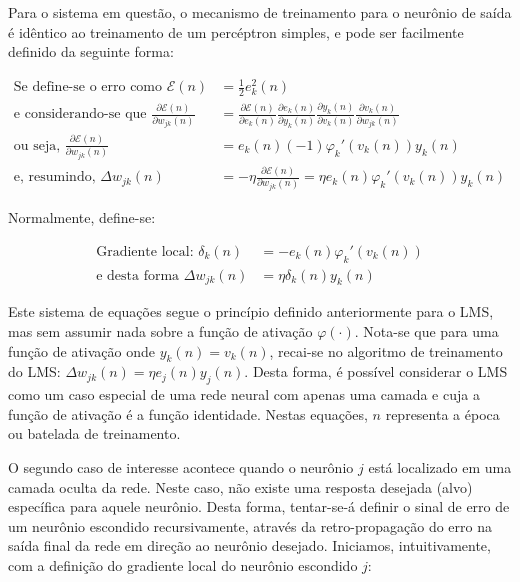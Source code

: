 Para o sistema em questão, o mecanismo de treinamento para o neurônio de saída
é idêntico ao treinamento de um percéptron simples, e pode ser facilmente
definido da seguinte forma:

\begin{align}
\text{Se define-se o erro como } \mathcal{E}(n) &= \frac{1}{2}e_{k}^{2}(n)
\label{eq:error-def} \\
\text{e considerando-se que } \frac{\partial\mathcal{E}(n)}{\partial
w_{jk}(n)} &= \frac{\partial\mathcal{E}(n)}{\partial e_k(n)} \frac{\partial
e_k(n)}{\partial y_k(n)} \frac{\partial y_k(n)}{\partial v_k(n)}
\frac{\partial v_k(n)}{\partial w_{jk}(n)} \label{eq:partials} \\
\text{ou seja, } \frac{\partial\mathcal{E}(n)}{\partial
w_{jk}(n)} &= e_k(n)(-1)\varphi_{k}'(v_{k}(n))y_{k}(n)
\label{eq:partials-solution} \\
\text{e, resumindo, } \Delta w_{jk}(n) &=
-\eta\frac{\partial\mathcal{E}(n)}{\partial w_{jk}(n)} = \eta
e_{k}(n)\varphi_{k}'(v_{k}(n))y_{k}(n)
\end{align}

Normalmente, define-se:

\begin{align}
\text{Gradiente local: } \delta_k(n) &= - e_k(n)\varphi_{k}'(v_k(n)) \\
\text{e desta forma } \Delta w_{jk}(n) &= \eta\delta_k(n)y_{k}(n)
\label{eq:neural-train}
\end{align}

Este sistema de equações segue o princípio definido anteriormente para o LMS,
mas sem assumir nada sobre a função de ativação $\varphi(\cdot)$. Nota-se que
para uma função de ativação onde $y_k(n) = v_k(n)$, recai-se no algoritmo de
treinamento do LMS: $\Delta w_{jk}(n) = \eta e_{j}(n)y_{j}(n)$. Desta forma, é
possível considerar o LMS como um caso especial de uma rede neural com apenas
uma camada e cuja a função de ativação é a função identidade. Nestas equações,
$n$ representa a época ou batelada de treinamento.

O segundo caso de interesse acontece quando o neurônio $j$ está localizado em
uma camada oculta da rede. Neste caso, não existe uma resposta desejada (alvo)
específica para aquele neurônio. Desta forma, tentar-se-á definir o sinal de
erro de um neurônio escondido recursivamente, através da retro-propagação do
erro na saída final da rede em direção ao neurônio desejado. Iniciamos,
intuitivamente, com a definição do gradiente local do neurônio escondido $j$:

